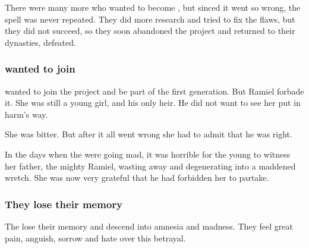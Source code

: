 There were many more who wanted to become \malachim, but sinced it went so wrong, the spell was never repeated. 
They did more research and tried to fix the flaws, but they did not succeed, so they soon abandoned the project and returned to their dynasties, defeated. 





\subsubsection{\Cishiel{} wanted to join}
 wanted to join the \malach{} project and be part of the first generation. 
But Ramiel forbade it. 
She was still a young girl, and his only heir. 
He did not want to see her put in harm's way. 

She was bitter. 
But after it all went wrong she had to admit that he was right. 

In the days when the \malachim{} were going mad, it was horrible for the young \Cishiel{} to witness her father, the mighty Ramiel, wasting away and degenerating into a maddened wretch. 
She was now very grateful that he had forbidden her to partake. 





\subsubsection{They lose their memory}
The \malachim{} lose their memory and descend into amnesia and madness. 
They feel great pain, anguish, sorrow and hate over this betrayal.


